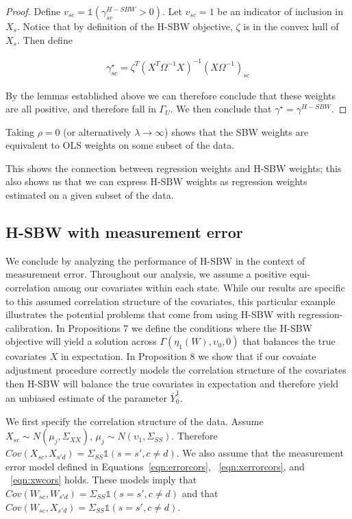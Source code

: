 \begin{proof}
Define $v_{sc} = \mathds{1}(\gamma_{sc}^{H-SBW} > 0)$. Let $v_{sc} = 1$ be an indicator of inclusion in $X_s$. Notice that by definition of the H-SBW objective, $\zeta$ is in the convex hull of $X_s$. Then define

\begin{align*}
    \gamma_{sc}^\star = \zeta^T(X^T\Omega^{-1}X)^{-1}(X\Omega^{-1})_{sc}
\end{align*}

By the lemmas established above we can therefore conclude that these weights are all positive, and therefore fall in $\Gamma_U$. We then conclude that $\gamma^\star = \gamma^{H-SBW}$.
\end{proof}

\begin{remark}
Taking $\rho = 0$ (or alternatively $\lambda \to \infty$) shows that the SBW weights are equivalent to OLS weights on some subset of the data.
\end{remark}

This shows the connection between regression weights and H-SBW weights; this also shows us that we can express H-SBW weights as regression weights estimated on a given subset of the data.

\subsection{H-SBW with measurement error}\label{app:AsecIII}

We conclude by analyzing the performance of H-SBW in the context of measurement error. Throughout our analysis, we assume a positive equi-correlation among our covariates within each state. While our results are specific to this assumed correlation structure of the covariates, this particular example illustrates the potential problems that come from using H-SBW with regression-calibration. In Propositions 7 we define the conditions where the H-SBW objective will yield a solution across $\Gamma(\eta_1(W), \upsilon_0, 0)$ that balances the true covariates $X$ in expectation. In Proposition 8 we show that if our covaiate adjustment procedure correctly models the correlation structure of the covariates then H-SBW will balance the true covariates in expectation and therefore yield an unbiased estimate of the parameter $\bar{Y}_0^1$.

We first specify the correlation structure of the data. Assume $X_{sc} \sim N(\mu_j, \Sigma_{XX})$, $\mu_j \sim N(\upsilon_1, \Sigma_{SS})$. Therefore $Cov(X_{sc}, X_{s'd}) = \Sigma_{SS}\mathds{1}(s = s', c \ne d)$. We also assume that the measurement error model defined in Equations~\ref{eqn:errorcors}, ~\ref{eqn:xerrorcors}, and ~\ref{eqn:xwcors} holds. These models imply that $Cov(W_{sc}, W_{s'd}) = \Sigma_{SS}\mathds{1}(s = s', c \ne d)$ and that $Cov(W_{sc}, X_{s'd}) = \Sigma_{SS}\mathds{1}(s = s', c \ne d)$. 

